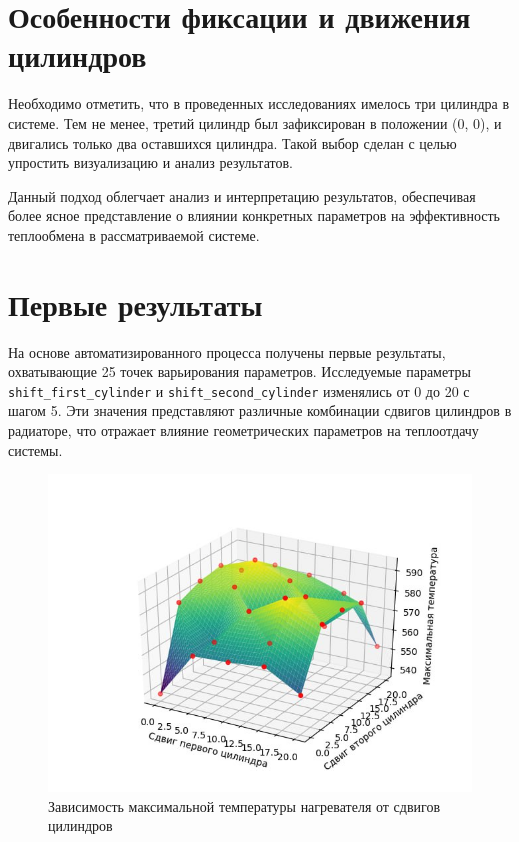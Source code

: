 \documentclass[a4paper,12pt]{article}
\theoremstyle{plain} %
\theoremstyle{definition} %
\theoremstyle{remark} %
\begin{document}
\section{Особенности фиксации и движения цилиндров}

Необходимо отметить, что в проведенных исследованиях имелось три цилиндра в системе. Тем не менее, третий цилиндр был зафиксирован в положении (0, 0), и двигались только два оставшихся цилиндра. Такой выбор сделан с целью упростить визуализацию и анализ результатов.

Данный подход облегчает анализ и интерпретацию результатов, обеспечивая более ясное представление о влиянии конкретных параметров на эффективность теплообмена в рассматриваемой системе.

\section{Первые результаты}

На основе автоматизированного процесса получены первые результаты, охватывающие 25 точек варьирования параметров. Исследуемые параметры \texttt{shift\_first\_cylinder} и \texttt{shift\_second\_cylinder} изменялись от 0 до 20 с шагом 5. Эти значения представляют различные комбинации сдвигов цилиндров в радиаторе, что отражает влияние геометрических параметров на теплоотдачу системы.

\begin{figure}[h]
	\begin{center}
		\includegraphics[width=0.4\linewidth]{16.1.jpg}
		\caption{Зависимость максимальной температуры нагревателя от сдвигов цилиндров} %
	\end{center}
\end{figure}
\end{document}
